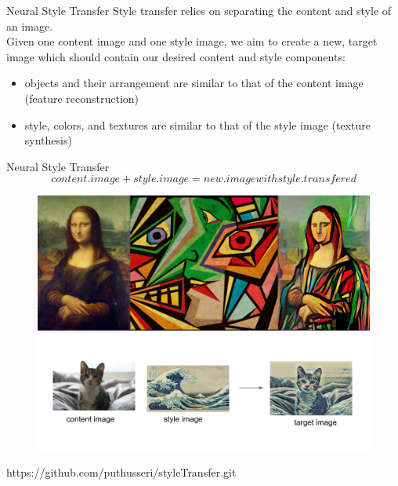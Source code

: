 
\begin{frame}[fragile]{Neural Style Transfer}
   Style transfer relies on separating the content and style of an image. 
   \\
   Given one content image and one style image, we aim to create a new, target image which should contain our desired content and style components:
    \begin{itemize}
        \item objects and their arrangement are similar to that of the content image (feature reconstruction)
        \item style, colors, and textures are similar to that of the style image (texture synthesis)
    \end{itemize}

\end{frame}


\begin{frame}[fragile]{Neural Style Transfer}
    \begin{equation}
        content.image + style.image =  new.image with style.transfered
    \end{equation}
    \begin{figure}[ht]
      \hspace*{-1cm}\includegraphics[width=0.5\linewidth]{styletransfer} \\
      \hspace*{-1cm}\includegraphics[width=0.7\linewidth]{styletransfercat} 
    \end{figure}
    https://github.com/puthusseri/styleTransfer.git
\end{frame}


